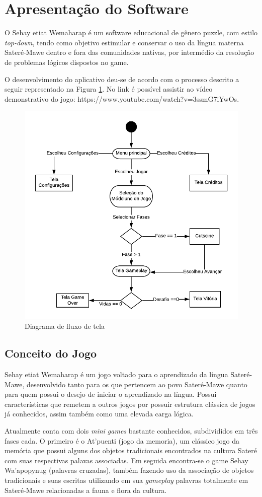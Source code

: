 \documentclass[12pt]{article}
\begin{document}
	\section{Apresentação do Software}
		O Sehay etiat Wemaharap é um software educacional de gênero puzzle, com estilo \textit{top-down}, tendo como objetivo estimular e conservar o uso da língua materna Sateré-Mawe dentro e fora das comunidades nativas, por intermédio da resolução de problemas lógicos dispostos no game.
		
		O desenvolvimento do aplicativo deu-se de acordo com o processo descrito a
		seguir representado na Figura \ref{fig:fluxoTela}. No link é possível assistir ao vídeo demonstrativo do jogo: https://www.youtube.com/watch?v=3ssmG7iYwOs. 
	
		\begin{figure}[htb]
			\centering
			\includegraphics[width=.6\textwidth]{IMG/diag_fluxo_tela.png}
			\caption{Diagrama de fluxo de tela}
			\label{fig:fluxoTela}
		\end{figure}

	\subsection{Conceito do Jogo}
		Sehay etiat Wemaharap é um jogo voltado para o aprendizado da língua Sateré-Mawe, desenvolvido tanto para os que pertencem ao povo Sateré-Mawe quanto para quem possui o desejo de iniciar o aprendizado na língua. Possui características que remetem a outros jogos por possuir estrutura clássica de jogos já conhecidos, assim também como uma elevada carga lógica.
		
		Atualmente conta com dois \textit{mini games} bastante conhecidos, subdivididos em três fases cada. O primeiro é o At'puenti (jogo da memoria), um clássico jogo da memória que possui alguns dos objetos tradicionais encontrados na cultura Sateré com suas respectivas palavas associadas. Em seguida encontra-se o game Sehay Wa’apopynug (palavras cruzadas), também fazendo uso da associação de objetos tradicionais e suas escritas utilizando em sua \textit{gameplay} palavras totalmente em Sateré-Mawe relacionadas a fauna e flora da cultura.    
		
\end{document}
